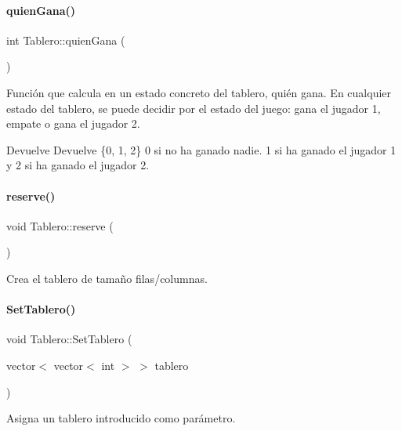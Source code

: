 \paragraph{\texorpdfstring{quien\+Gana()}{quienGana()}}
{\footnotesize\ttfamily int Tablero\+::quien\+Gana (\begin{DoxyParamCaption}{ }\end{DoxyParamCaption})}



Función que calcula en un estado concreto del tablero, quién gana. En cualquier estado del tablero, se puede decidir por el estado del juego\+: gana el jugador 1, empate o gana el jugador 2. 

\begin{DoxyReturn}{Devuelve}
Devuelve \{0, 1, 2\} 0 si no ha ganado nadie. 1 si ha ganado el jugador 1 y 2 si ha ganado el jugador 2. 
\end{DoxyReturn}
\hypertarget{classTablero_ac2a20883f540c4d010dafab236390cb3}{}\label{classTablero_ac2a20883f540c4d010dafab236390cb3} 
\paragraph{\texorpdfstring{reserve()}{reserve()}}
{\footnotesize\ttfamily void Tablero\+::reserve (\begin{DoxyParamCaption}{ }\end{DoxyParamCaption})\hspace{0.3cm}{\ttfamily [private]}}



Crea el tablero de tamaño filas/columnas. 

\hypertarget{classTablero_a811481680b64300b21fb4d1e9619e795}{}\label{classTablero_a811481680b64300b21fb4d1e9619e795} 
\paragraph{\texorpdfstring{Set\+Tablero()}{SetTablero()}}
{\footnotesize\ttfamily void Tablero\+::\+Set\+Tablero (\begin{DoxyParamCaption}\item[{vector$<$ vector$<$ int $>$ $>$}]{tablero }\end{DoxyParamCaption})}



Asigna un tablero introducido como parámetro. 


